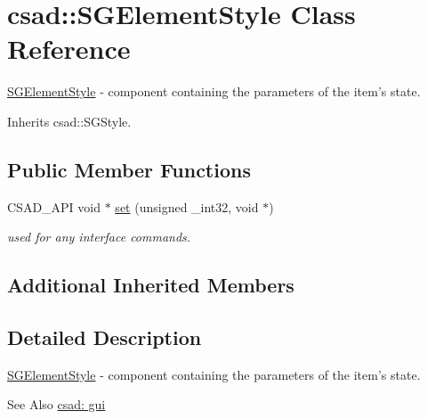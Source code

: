 \hypertarget{classcsad_1_1_s_g_element_style}{\section{csad\-:\-:S\-G\-Element\-Style Class Reference}
\label{classcsad_1_1_s_g_element_style}
}


\hyperlink{classcsad_1_1_s_g_element_style}{S\-G\-Element\-Style} -\/ component containing the parameters of the item's state.  




Inherits csad\-::\-S\-G\-Style.

\subsection*{Public Member Functions}
\begin{DoxyCompactItemize}
\item 
\hypertarget{classcsad_1_1_s_g_element_style_ace184b6a45121c9b87daf8d5a9b760af}{C\-S\-A\-D\-\_\-\-A\-P\-I void $\ast$ \hyperlink{classcsad_1_1_s_g_element_style_ace184b6a45121c9b87daf8d5a9b760af}{set} (unsigned \-\_\-int32, void $\ast$)}\label{classcsad_1_1_s_g_element_style_ace184b6a45121c9b87daf8d5a9b760af}

\begin{DoxyCompactList}\small\item\em used for any interface commands. \end{DoxyCompactList}\end{DoxyCompactItemize}
\subsection*{Additional Inherited Members}


\subsection{Detailed Description}
\hyperlink{classcsad_1_1_s_g_element_style}{S\-G\-Element\-Style} -\/ component containing the parameters of the item's state. 

\begin{DoxySeeAlso}{See Also}
\hyperlink{group__scenegui}{csad\-: gui} 
\end{DoxySeeAlso}
